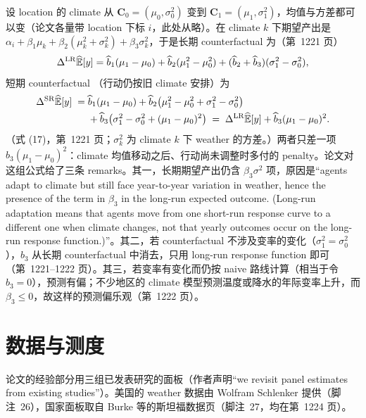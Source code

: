 设 location 的 climate 从 $\mathbf{C}_0=(\mu_0,\sigma_0^2)$ 变到 $\mathbf{C}_1=(\mu_1,\sigma_1^2)$，均值与方差都可以变（论文各量带 location 下标 $i$，此处从略）。在 climate $k$ 下期望产出是 $\alpha_i+\beta_1\mu_k+\beta_2(\mu_k^2+\sigma_k^2)+\beta_3\sigma_k^2$，于是长期 counterfactual 为（第~1221 页）
\begin{equation*}
\Delta^{\mathrm{LR}}\widehat{\mathbb{E}}[y] = \widehat{b}_1(\mu_1-\mu_0) + \widehat{b}_2(\mu_1^2-\mu_0^2) + (\widehat{b}_2+\widehat{b}_3)(\sigma_1^2-\sigma_0^2),
\end{equation*}
短期 counterfactual （行动仍按旧 climate 安排）为
\begin{align}
\Delta^{\mathrm{SR}}\widehat{\mathbb{E}}[y] \;=\;& \widehat{b}_1(\mu_1-\mu_0) + \widehat{b}_2\bigl(\mu_1^2-\mu_0^2+\sigma_1^2-\sigma_0^2\bigr) \notag\\
&+ \widehat{b}_3\bigl(\sigma_1^2-\sigma_0^2+(\mu_1-\mu_0)^2\bigr)
\;=\; \Delta^{\mathrm{LR}}\widehat{\mathbb{E}}[y] + \widehat{b}_3(\mu_1-\mu_0)^2 .
\label{eq:cca-cf}
\end{align}
（式 (17)，第~1221 页；$\sigma_k^2$ 为 climate $k$ 下 weather 的方差。）两者只差一项 $\widehat{b}_3(\mu_1-\mu_0)^2$：climate 均值移动之后、行动尚未调整时多付的 penalty。论文对这组公式给了三条 remarks。其一，长期期望产出仍含 $\beta_3\sigma^2$ 项，原因是``agents adapt to climate but still face year-to-year variation in weather, hence the presence of the term in $\beta_3$ in the long-run expected outcome. (Long-run adaptation means that agents move from one short-run response curve to a different one when climate changes, not that yearly outcomes occur on the long-run response function.)''\citep[第~1221 页]{merel2021climate}。其二，若 counterfactual 不涉及变率的变化（$\sigma_1^2=\sigma_0^2$），$\widehat{b}_3$ 从长期 counterfactual 中消去，只用 long-run response function 即可（第~1221--1222 页）。其三，若变率有变化而仍按 naive 路线计算（相当于令 $\widehat{b}_3=0$），预测有偏；不少地区的 climate 模型预测温度或降水的年际变率上升，而 $\beta_3\le 0$，故这样的预测偏乐观（第~1222 页）。

\section{数据与测度}

论文的经验部分用三组已发表研究的面板（作者声明``we revisit panel estimates from existing studies''\citep[第~1224 页]{merel2021climate}）。美国的 weather 数据由 Wolfram Schlenker 提供（脚注~26），国家面板取自 Burke 等的斯坦福数据页（脚注~27，均在第~1224 页）。

